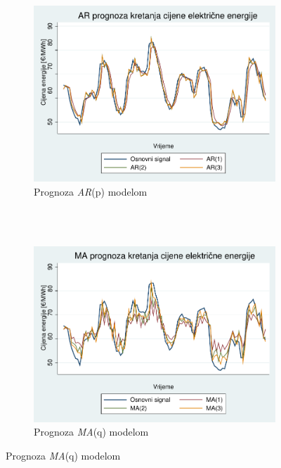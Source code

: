 \documentclass[a4paper,12pt,oneside]{memoir}
\begin{document}
        \begin{figure}[H]
            \centering
            \begin{subfigure}[b] {0.50\linewidth}
                \centering
                \includegraphics[width=\textwidth]{graphs/price_graph_ar.pdf}
                \caption{Prognoza \textit{AR}(p) modelom}
                \label{fig:price_graph_ar}
            \end{subfigure}
            \\~\\
            \begin{subfigure}[b] {0.50\linewidth}
                \centering
                \includegraphics[width=\textwidth]{graphs/price_graph_ma.pdf}
                \caption{Prognoza \textit{MA}(q) modelom}      

\end{subfigure}
\end{figure}
\end{document}
